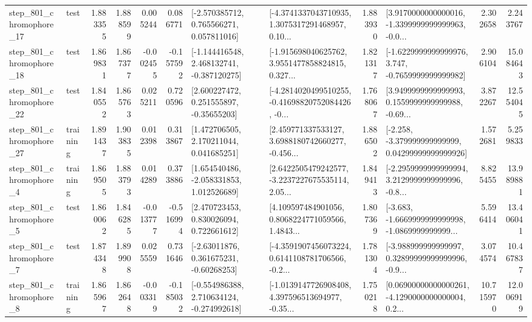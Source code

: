 \begin{tabular}{llrrrrllrlrr}
  step\_801\_chromophore\_17 &      test &      1.883355 &    1.888599 &      0.005244 &  0.086771 &    [-2.570385712, 0.765566271, 0.057811016] &  [-4.3741337043710935, 1.3075317291468957, 0.10... &       1.883930 &  [3.9170000000000016, -1.3399999999999963, -0.0... &            2.302658 &          2.243767 \\
  step\_801\_chromophore\_18 &      test &      1.869831 &    1.867377 &     -0.002455 & -0.157592 &   [-1.144416548, 2.468132741, -0.387120275] &  [-1.915698040625762, 3.9551477858824815, 0.327... &       1.821317 &  [-1.6229999999999976, 3.747, -0.7659999999999982] &            2.906104 &         15.084643 \\
  step\_801\_chromophore\_22 &      test &      1.840552 &    1.865763 &      0.025211 &  0.720596 &     [2.600227472, 0.251555897, -0.35655203] &  [-4.2814020499510255, -0.41698820752084426, -0... &       1.768067 &  [3.9499999999999993, 0.1559999999999988, -0.69... &            3.872267 &         12.554045 \\
  step\_801\_chromophore\_27 &  training &      1.891437 &    1.903835 &      0.012398 &  0.313867 &     [1.472706505, 2.170211044, 0.041685251] &  [2.459771337533127, 3.6988180742660277, -0.456... &       1.886502 &  [-2.258, -3.379999999999999, 0.04299999999999926] &            1.572681 &          5.259833 \\
   step\_801\_chromophore\_4 &  training &      1.869505 &    1.883793 &      0.014289 &  0.373886 &    [1.654540486, -2.058331853, 1.012526689] &  [2.6422505479242577, -3.2237227675535114, 2.05... &       1.849413 &  [-2.2959999999999994, 3.2129999999999996, -0.8... &            8.825455 &         13.989881 \\
   step\_801\_chromophore\_5 &      test &      1.860062 &    1.846285 &     -0.013777 & -0.516994 &     [2.470723453, 0.830026094, 0.722661612] &  [4.109597484901056, 0.8068224771059566, 1.4843... &       1.807369 &  [-3.683, -1.6669999999999998, -1.0869999999999... &            5.596414 &         13.406041 \\
   step\_801\_chromophore\_7 &      test &      1.874348 &    1.899908 &      0.025559 &  0.731646 &     [-2.63011876, 0.361675231, -0.60268253] &  [-4.3591907456073224, 0.6141108781706566, -0.2... &       1.781304 &  [-3.988999999999997, 0.32899999999999996, -0.9... &            3.074574 &         10.467837 \\
   step\_801\_chromophore\_8 &  training &      1.865967 &    1.862648 &     -0.003319 & -0.185032 &   [-0.554986388, 2.710634124, -0.274992618] &  [-1.0139147726908408, 4.397596513694977, -0.35... &       1.750218 &  [0.06900000000000261, -4.1290000000000004, 0.2... &           10.715970 &         12.006919 \\

\end{tabular}
